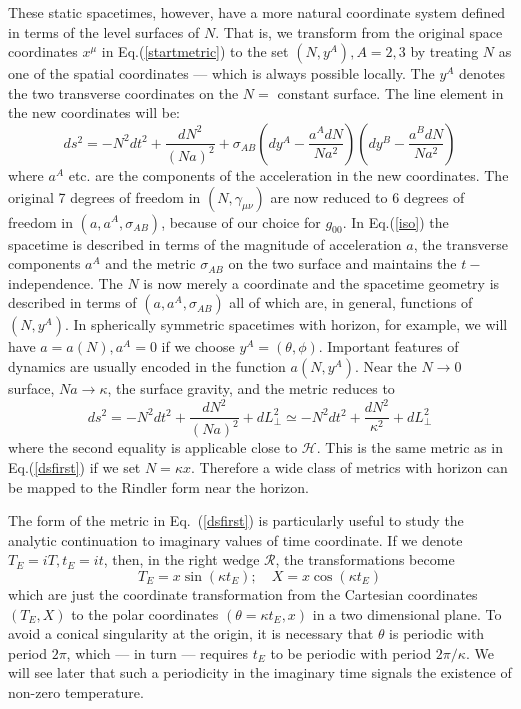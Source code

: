 \documentclass[12pt]{iopart}
\def\eq#1{{Eq.~(\ref{#1})}}
\begin{document}
These static spacetimes, however,  have a more natural coordinate system defined in terms of the level surfaces of $N$. That is, we transform from the original space coordinates $x^\mu$ in Eq.(\ref{startmetric}) to the set $(N,y^A), A=2,3$ by treating $N$ as one of the  spatial coordinates  ---  which is always possible locally. The $y^A$ denotes the two
transverse coordinates on the $N=$ constant surface. The line element in the new coordinates will be:
\begin{equation}
ds^2=-N^2dt^2+ \frac{dN^2}{(Na)^{2}}+
\sigma_{AB}(dy^A-\frac{a^A dN}{Na^2})(dy^B-\frac{a^BdN}{Na^2})
\label{iso}
\end{equation}
where $a^A$ etc. are the components of the acceleration in the new coordinates.
The original 7 degrees of freedom in $(N,\gamma_{\mu\nu})$ are now reduced to 6 degrees of freedom in $(a,a^A,
\sigma_{AB})$, because of our choice for $g_{00}$.  In  Eq.(\ref{iso})  the spacetime
is described
in terms of
the magnitude  of acceleration $a$, the transverse components $a^A$ and the  metric $\sigma_{AB}$ on 
the two surface and maintains the $t-$independence. 
The $N$ is now merely a coordinate and the spacetime geometry is  described in terms of 
$(a,a^A,\sigma_{AB})$
all of which are, in general, functions of $(N,y^A)$. In  spherically symmetric spacetimes with horizon, for example, we will have $a=a(N),a^A=0$ if we choose $y^A=(\theta,\phi)$. Important features of dynamics are usually encoded in 
the function $a(N,y^A)$.
Near the $N\to 0$ surface, $Na\to \kappa$, the surface gravity, and the metric reduces to 
   \begin{equation}
   ds^2=-N^2dt^2+ \frac{dN^2}{(Na)^{2}}+dL_\perp^2
   \simeq-N^2 dt^2 + \frac{dN^2}{\kappa^2} +dL_\perp^2
   \label{dssecond}
   \end{equation}
    where   the second equality is applicable 
   close to  $\mathcal{H}$.
This  is the same metric as in  
 Eq.(\ref{dsfirst}) if we set $N=\kappa x$.
 Therefore a wide class of metrics with horizon can be mapped to the Rindler form near the horizon.
 
 The form of the metric in \eq{dsfirst} is particularly useful to study the analytic continuation to imaginary values of time coordinate. If we denote $T_E = i T, t_E = i t$, then, in the right wedge $\mathcal{R}$, 
the transformations become
\begin{equation}
  T_E=x \sin (\kappa t_E); \quad X= x \cos (\kappa t_E)
   \label{expeuclid}
   \end{equation}
which are just the coordinate transformation from the Cartesian coordinates $(T_E, X)$
to the polar coordinates $(\theta=\kappa t_E, x)$ in a two dimensional plane. To avoid a conical singularity at the origin, it is necessary that $\theta$ is periodic with period $2\pi$, which --- in turn --- requires $t_E$ to be periodic with period $2\pi/\kappa$. We will see later that such a periodicity in the imaginary time signals the existence of non-zero temperature.
\end{document}

